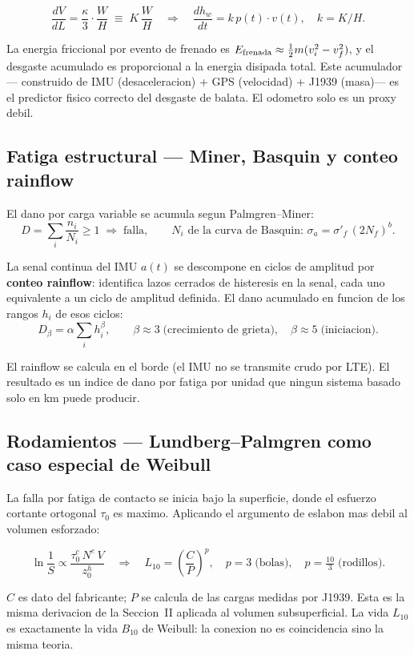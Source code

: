 \documentclass[11pt,a4paper]{article}
\begin{document}
$$\frac{dV}{dL} = \frac{\kappa}{3}\cdot\frac{W}{H}
  \;\equiv\; K\,\frac{W}{H}
  \quad\Longrightarrow\quad
  \boxed{\frac{dh_w}{dt} = k\,p(t)\cdot v(t), \quad k = K/H.}$$

La energia friccional por evento de frenado es
$E_{\rm frenada} \approx \frac{1}{2}m(v_i^2 - v_f^2)$, y el desgaste
acumulado es proporcional a la energia disipada total. Este acumulador ---
construido de IMU (desaceleracion) + GPS (velocidad) + J1939 (masa)---
es el predictor fisico correcto del desgaste de balata. El odometro solo
es un proxy debil.

\subsection{Fatiga estructural --- Miner, Basquin y conteo rainflow}

El dano por carga variable se acumula segun Palmgren--Miner:
$$D = \sum_i \frac{n_i}{N_i} \geq 1 \;\Rightarrow\; \text{falla},
  \qquad N_i \text{ de la curva de Basquin: }
  \sigma_a = \sigma'_f\,(2N_f)^b.$$

La senal continua del IMU $a(t)$ se descompone en ciclos de amplitud
por \textbf{conteo rainflow}: identifica lazos cerrados de histeresis en
la senal, cada uno equivalente a un ciclo de amplitud definida. El dano
acumulado en funcion de los rangos $h_i$ de esos ciclos:
$$D_\beta = \alpha\sum_i h_i^\beta,
  \qquad \beta \approx 3\;\text{(crecimiento de grieta)},
  \quad \beta \approx 5\;\text{(iniciacion)}.$$

El rainflow se calcula en el borde (el IMU no se transmite crudo por LTE).
El resultado es un indice de dano por fatiga por unidad que ningun sistema
basado solo en km puede producir.

\subsection{Rodamientos --- Lundberg--Palmgren como caso especial de Weibull}

La falla por fatiga de contacto se inicia bajo la superficie, donde el
esfuerzo cortante ortogonal $\tau_0$ es maximo. Aplicando el argumento
de eslabon mas debil al volumen esforzado:

$$\ln\frac{1}{S} \propto \frac{\tau_0^c\,N^e\,V}{z_0^h}
  \quad\Longrightarrow\quad
  \boxed{L_{10} = \left(\frac{C}{P}\right)^p,
  \quad p=3\;\text{(bolas)},\quad p=\tfrac{10}{3}\;\text{(rodillos)}.}$$

$C$ es dato del fabricante; $P$ se calcula de las cargas medidas por J1939.
Esta es la misma derivacion de la Seccion~II aplicada al volumen subsuperficial.
La vida $L_{10}$ es exactamente la vida $B_{10}$ de Weibull: la conexion
no es coincidencia sino la misma teoria.
\end{document}
